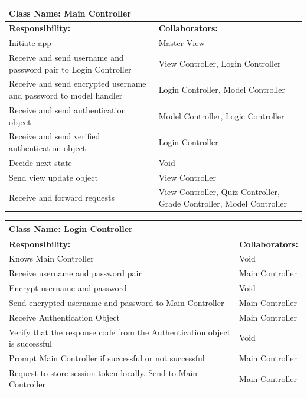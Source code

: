 \documentclass[]{article}
\begin{document}

	\begin{table}[H]
	\centering
		\begin{tabular}{|p{9cm}|p{3cm}|}
		\hline
		 \multicolumn{2}{|l|}{\textbf{Class Name: Main Controller}} \\
		\hline
		\textbf{Responsibility:} & \textbf{Collaborators:} \\
		\hline
		Initiate app & Master View \\
		\hline
		Receive and send username and password pair to Login Controller & View Controller, Login Controller
		\\
		\hline
		Receive and send encrypted username and password to model handler & Login Controller, Model Controller \\
		\hline
		Receive and send authentication object & Model Controller, Logic Controller
        \\
		\hline
		Receive and send verified authentication object & Login Controller \\
		\hline
		Decide next state & Void \\
		\hline
		Send view update object & View Controller \\
		\hline
	    Receive and forward  requests & View Controller, Quiz Controller, Grade Controller, Model Controller  \\
		\hline
		\end{tabular}
	\end{table}
	

	\begin{table}[H]
	\centering
		\begin{tabular}{|p{9cm}|p{3cm}|}
		\hline
		 \multicolumn{2}{|l|}{\textbf{Class Name: Login Controller}} \\
		\hline
		\textbf{Responsibility:} & \textbf{Collaborators:} \\
		\hline
		Knows Main Controller & Void\\
		\hline
		Receive username and password pair  & Main Controller \\
		\hline
		Encrypt username and password & Void
		\\
		\hline
		Send encrypted username and password to Main Controller & Main Controller \\
		\hline
		Receive Authentication Object & Main Controller 
        \\
		\hline
		Verify that the response code from the Authentication object is successful & Void \\
		\hline
		Prompt Main Controller if successful or not successful & Main Controller \\
		\hline
		Request to store session token locally. Send to Main Controller & Main Controller \\
		\hline
		\end{tabular}
	\end{table}
	
\end{document}
